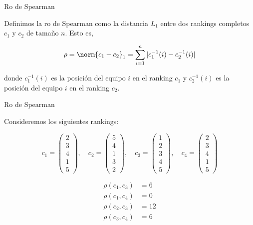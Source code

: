 \documentclass[10pt,hyperref={unicode}]{beamer}
\begin{document}
	\begin{frame}{Ro de Spearman}
		\begin{defi}
			Definimos la ro de Spearman como la distancia $L_1$ entre dos rankings completos $c_1$ y $c_2$ de tamaño $n$. Esto es, 
			
			\begin{equation}
			\rho = \norm{c_1 - c_2}_1 = \sum\limits_{i=1}^{n} |c_1^{-1}(i) - c_2^{-1}(i)|
			\end{equation}
			
			donde $c_1^{-1}(i)$ es la posición del equipo $i$ en el ranking $c_1$ y $c_2^{-1}(i)$ es la posición del equipo $i$ en el ranking $c_2$.
		\end{defi}
	
	\end{frame}
	
	\begin{frame}{Ro de Spearman}
		\begin{ejemplo}
			Consideremos los siguientes rankings:
			
			\begin{equation*}
			c_1 = \left( \begin{array}{c}
			2\\
			3\\
			4\\
			1\\
			5
			\end{array} \right), \quad
			c_2 = \left( \begin{array}{c}
			5\\
			4\\
			1\\
			3\\
			2
			\end{array} \right), \quad
			c_3 = \left( \begin{array}{c}
			1\\
			2\\
			3\\
			4\\
			5
			\end{array} \right), \quad
			c_4 = \left( \begin{array}{c}
			2\\
			3\\
			4\\
			1\\
			5
			\end{array} \right)
			\end{equation*}
			
			\begin{align*}
			\rho(c_1, c_3) & = 6\\
			\rho(c_1, c_4) & = 0\\
			\rho(c_2, c_3) & = 12\\
			\rho(c_3, c_4) & = 6
			\end{align*}  
		\end{ejemplo}
		
	\end{frame}
	
\end{document}
